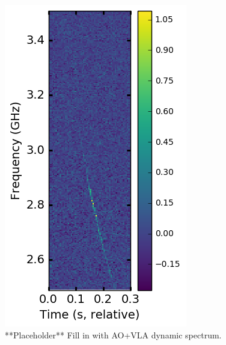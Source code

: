 \documentclass[twocolumn]{aastex61}
\begin{document}
\begin{figure}[htb]
\begin{center}
%
%
 \includegraphics[width=0.9\columnwidth]{sgram_57623.png}
 \caption{**Placeholder** Fill in with AO+VLA dynamic spectrum.
 \label{fig:sgram}}
\end{center}
\end{figure}
\end{document}
